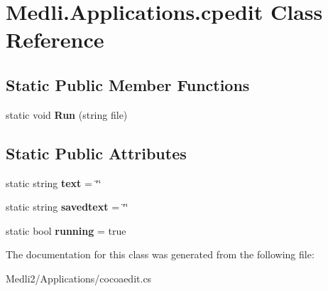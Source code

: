 \hypertarget{class_medli_1_1_applications_1_1cpedit}{}\section{Medli.\+Applications.\+cpedit Class Reference}
\label{class_medli_1_1_applications_1_1cpedit}
\subsection*{Static Public Member Functions}
\begin{DoxyCompactItemize}
\item 
\mbox{\label{class_medli_1_1_applications_1_1cpedit_a868174f50e85701db743f72651b6cc1e}} 
static void {\bfseries Run} (string file)
\end{DoxyCompactItemize}
\subsection*{Static Public Attributes}
\begin{DoxyCompactItemize}
\item 
\mbox{\label{class_medli_1_1_applications_1_1cpedit_a8a050016b1379ac1788b25c92c8c7204}} 
static string {\bfseries text} = \char`\"{}\char`\"{}
\item 
\mbox{\label{class_medli_1_1_applications_1_1cpedit_a85875eb3d2fabf46d0766912817bbf06}} 
static string {\bfseries savedtext} = \char`\"{}\char`\"{}
\item 
\mbox{\label{class_medli_1_1_applications_1_1cpedit_ab320b092caa3c72224297a99f484cad0}} 
static bool {\bfseries running} = true
\end{DoxyCompactItemize}


The documentation for this class was generated from the following file\+:\begin{DoxyCompactItemize}
\item 
Medli2/\+Applications/cocoaedit.\+cs\end{DoxyCompactItemize}
